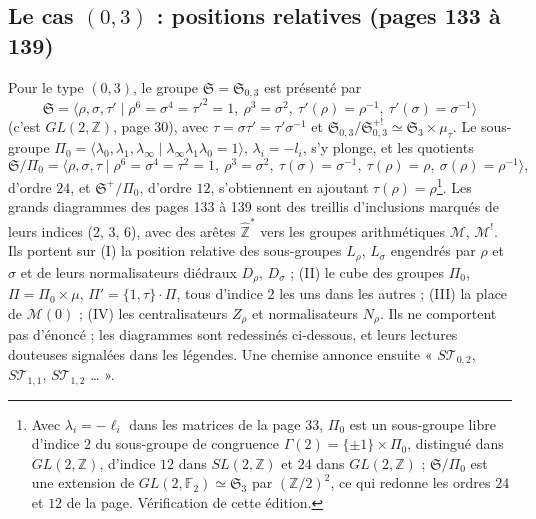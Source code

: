 \documentclass[11pt,a4paper]{article}
\begin{document}
\subsection*{Le cas $(0,3)$ : positions relatives (pages 133 à 139)}

Pour le type $(0,3)$, le groupe $\mathfrak{S} = \mathfrak{S}_{0,3}$ est présenté
par
\[
\mathfrak{S} = \langle \rho, \sigma, \tau' \mid \rho^6 = \sigma^4 = \tau'^2 = 1,\ \rho^3 = \sigma^2,\ \tau'(\rho) = \rho^{-1},\ \tau'(\sigma) = \sigma^{-1} \rangle
\]
(c'est $GL(2, \mathbb{Z})$, page 30), avec $\tau = \sigma\tau' = \tau'\sigma^{-1}$ et
$\mathfrak{S}_{0,3}/\mathfrak{S}^{+!}_{0,3} \simeq \mathfrak{S}_3 \times \mu_\tau$.
Le sous-groupe $\Pi_0 = \langle \lambda_0, \lambda_1, \lambda_\infty \mid \lambda_\infty\lambda_1\lambda_0 = 1 \rangle$,
$\lambda_i = -l_i$, s'y plonge, et les quotients
\[
\mathfrak{S}/\Pi_0 = \langle \rho, \sigma, \tau \mid \rho^6 = \sigma^4 = \tau^2 = 1,\ \rho^3 = \sigma^2,\ \tau(\sigma) = \sigma^{-1},\ \tau(\rho) = \rho,\ \sigma(\rho) = \rho^{-1} \rangle,
\]
d'ordre $24$, et $\mathfrak{S}^+/\Pi_0$, d'ordre $12$, s'obtiennent en ajoutant
$\tau(\rho) = \rho$\footnote{Avec $\lambda_i = -\ell_i$ dans les matrices de la page 33, $\Pi_0$ est un
sous-groupe libre d'indice $2$ du sous-groupe de congruence
$\Gamma(2) = \{\pm 1\} \times \Pi_0$, distingué dans $GL(2, \mathbb{Z})$, d'indice
$12$ dans $SL(2, \mathbb{Z})$ et $24$ dans $GL(2, \mathbb{Z})$ ; $\mathfrak{S}/\Pi_0$
est une extension de $GL(2, \mathbb{F}_2) \simeq \mathfrak{S}_3$ par
$(\mathbb{Z}/2)^2$, ce qui redonne les ordres $24$ et $12$ de la page.
Vérification de cette édition.}. Les grands diagrammes
des pages 133 à 139 sont des treillis d'inclusions marqués de leurs
indices ($2$, $3$, $6$), avec des arêtes $\widehat{\mathbb{Z}}^*$ vers les
groupes arithmétiques $\mathcal{M}$, $\mathcal{M}^!$. Ils portent sur (I) la position relative des sous-groupes $L_\rho$, $L_\sigma$
engendrés par $\rho$ et $\sigma$ et de leurs normalisateurs diédraux $D_\rho$,
$D_\sigma$ ; (II) le cube des groupes $\Pi_0$, $\Pi = \Pi_0 \times \mu$,
$\Pi' = \{1, \tau\} \cdot \Pi$, tous d'indice $2$ les uns dans les autres ;
(III) la place de $\mathcal{M}(0)$ ; (IV) les centralisateurs $Z_\rho$ et
normalisateurs $N_\rho$. Ils ne comportent pas d'énoncé ; les diagrammes
sont redessinés ci-dessous, et leurs lectures douteuses signalées dans les légendes.
Une chemise annonce ensuite « $S\mathcal{T}_{0,2}$, $S\mathcal{T}_{1,1}$,
$S\mathcal{T}_{1,2}$ … ».
\end{document}
